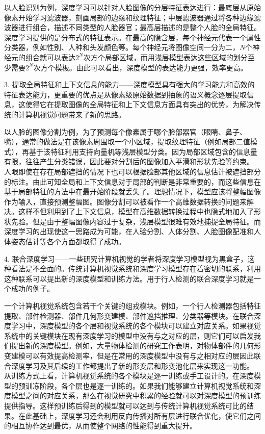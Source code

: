 \begin{example}
以人脸识别为例，深度学习可以针对人脸图像的分层特征表达进行：最底层从原始像素开始学习滤波器，刻画局部的边缘和纹理特征；中层滤波器通过将各种边缘滤波器进行组合，描述不同类型的人脸器官；最高层描述的是整个人脸的全局特征。深度学习提供的是分布式的特征表示。在最高的隐含层，每个神经元代表一个属性分类器，例如性别、人种和头发颜色等。每个神经元将图像空间一分为二，$N$个神经元的组合就可以表达$2^N$次方个局部区域，而用浅层模型表达这些区域的划分至少需要$2^N$次方个模板。由此可以看出，深度模型的表达能力更强，效率更高。
\end{example}

3. 提取全局特征和上下文信息的能力——深度模型具有强大的学习能力和高效的特征表达能力，更重要的优点是从像素级原始数据到抽象的语义概念逐层提取信息，这使得它在提取图像的全局特征和上下文信息方面具有突出的优势，为解决传统的计算机视觉问题带来了新的思路。

\begin{example}
以人脸的图像分割为例，为了预测每个像素属于哪个脸部器官（眼睛、鼻子、嘴），通常的做法是在该像素周围取一个小区域，提取纹理特征（例如局部二值模式），再基于该特征利用支持向量机等浅层模型分类。因为局部区域包含的信息量有限，往往产生分类错误，因此要对分割后的图像加入平滑和形状先验等约束。
人眼即使在存在局部遮挡的情况下也可以根据脸部其他区域的信息估计被遮挡部分的标注。由此可知全局和上下文信息对于局部的判断是非常重要的，而这些信息在基于局部特征的方法中在最开始阶段就丢失了。理想情况下，模型应该将整幅图像作为输入，直接预测整幅图。图像分割可以被看作一个高维数据转换的问题来解决。这样不但利用到了上下文信息，模型在高维数据转换过程中也隐式地加入了形状先验。但是由于整幅图像内容过于复杂，浅层模型很难有效地捕捉全局特征。而深度学习的出现使这一思路成为可能，在人验分割、人体分割、人脸图像配准和人体姿态估计等各个方面都取得了成功。
\end{example}

4. 联合深度学习——一些研究计算机视觉的学者将深度学习模型视为黑盒子，这种看法是不全面的。传统计算机视觉系统和深度学习模型存在着密切的联系，利用这种联系可以提出新的深度模型和训练方法。用于行人检测的联合深度学习就是一个成功的例子。
\begin{example}
一个计算机视觉系统包含若干个关键的组戎模块。例如，一个行人检测器包括特征提取、部件检测器、部件几何形变建模、部件遮挡推理、分类器等模块。在联合深度学习中，深度模型的各个层和视觉系统的各个模块可以建立对应关系。如果视觉系统中的关键模块在现有深度学习的模型中没有与之对应的层，则它们可以启发我们提出新的深度模型。例如，大量物体检测的研究工作表明，对物体部件的几何形变建模可以有效提高检测率，但是在常用的深度模型中没有与之相对应的层因此联合深度学习及其后续的工作都提出了新的形变层和形变池化层来实现这一功能。
从训练方式上看，计算机视觉系统的各个模块是逐一训练或手工设计的。在深度模型的预训冻阶段，各个层也是逐一训练的。如果我们能够建立计算机视觉系统和深度模型之间的对应关系，那么在视觉研究中积累的经验就可以对深度模型的预训练提供指导。这样预训练后得到的模型就可以达到与传统计算机视觉系统可比的结果。在此基础上，深度学习还会利用反向传播对所有层进行联合优化，使它们之间的相互协作达到最优，从而使整个网络的性能得到重大提升。
\end{example}
